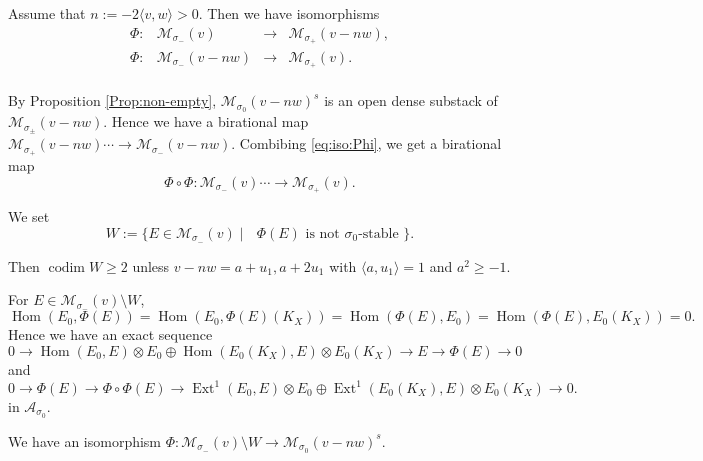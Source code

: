 \documentclass[leqno,11pt]{amsart}
\def\codim{\mathop{\mathrm{codim}}\nolimits}
\def\Ext{\mathop{\mathrm{Ext}}\nolimits}
\def\Hom{\mathop{\mathrm{Hom}}\nolimits}
\theoremstyle{definition}
\def\AA{\ensuremath{\mathcal A}}
\def\MM{\ensuremath{\mathcal M}}
\begin{document}
Assume that $n:=-2\langle v,w \rangle>0$.
Then we have isomorphisms
\begin{equation}\label{eq:iso:Phi}
\begin{matrix}
\Phi:& \MM_{\sigma_-}(v)& \to& \MM_{\sigma_+}(v-nw),\\
\Phi:& \MM_{\sigma_-}(v-nw)& \to& \MM_{\sigma_+}(v).\\
\end{matrix}
\end{equation}



By Proposition \ref{Prop:non-empty},
$\MM_{\sigma_0}(v-nw)^s$ is an open dense substack
of $\MM_{\sigma_\pm}(v-nw)$.
Hence we have a birational map
$ \MM_{\sigma_+}(v-nw) \cdots \to \MM_{\sigma_-}(v-nw)$.
Combibing \eqref{eq:iso:Phi}, we get a birational map
$$
\Phi \circ \Phi:\MM_{\sigma_-}(v) \cdots \to \MM_{\sigma_+}(v).
$$



We set
\begin{equation}
W:=\{E \in \MM_{\sigma_-}(v) 
\mid \text{ $\Phi(E)$ is not $\sigma_0$-stable } \}.
\end{equation}

Then $\codim W \geq 2$ unless $v-nw=a+u_1,a+2u_1$ with 
$\langle a,u_1 \rangle=1$ and $a^2 \geq -1$.

For $E \in \MM_{\sigma_-}(v) \setminus W$,
$$
\Hom(E_0,\Phi(E))=\Hom(E_0,\Phi(E)(K_X))=
\Hom(\Phi(E),E_0)=\Hom(\Phi(E),E_0(K_X))=0.
$$
Hence 
we have an exact sequence
\begin{equation}
0 \to \Hom(E_0,E) \otimes E_0 \oplus
\Hom(E_0(K_X),E) \otimes E_0(K_X) \to
E \to \Phi(E) \to 0
\end{equation}
 and
\begin{equation}
0 \to \Phi(E) \to \Phi \circ \Phi(E) \to \Ext^1(E_0,E) \otimes E_0 \oplus
\Ext^1(E_0(K_X),E) \otimes E_0(K_X)  \to 0.
\end{equation}
in $\AA_{\sigma_0}$.


We have an isomorphism
$\Phi: \MM_{\sigma_-}(v) \setminus W \to 
\MM_{\sigma_0}(v-n w)^s$.















\subsubsection{}
\end{document}
